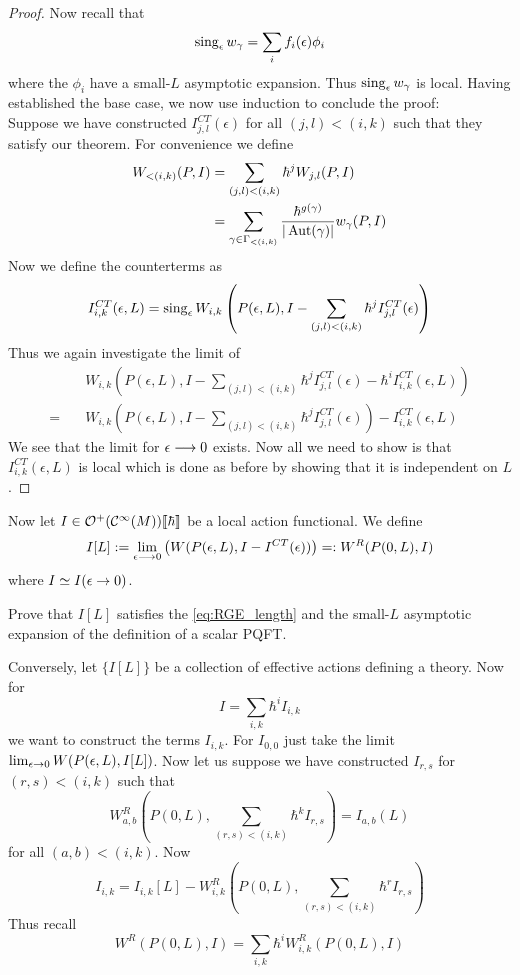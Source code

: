 \begin{theo}
\begin{proof}
  Now recall that
  $$ \sing_\epsilon w_\gamma = \sum_i f_i(\epsilon) \phi_i $$
  where the $\phi_i$ have a small-$L$ asymptotic expansion. Thus $\sing_\epsilon w_\gamma$ is local. Having established the base case, we now use induction to conclude the proof:\\
  Suppose we have constructed $I_{j,l}^{CT}(\epsilon)$ for all $(j,l)<(i,k)$ such that they satisfy our theorem. For convenience we define
  \begin{align}
    W_{<(i,k)} (P,I) &= \sum_{(j,l)<(i,k)} \hbar^j W_{j,l}(P,I)\\
    &= \sum_{\gamma \in \Gamma_{<(i,k)}} \frac{\hbar^{g(\gamma)}}{|\operatorname{Aut}(\gamma)|} w_\gamma (P,I)
  \end{align}
  Now we define the counterterms as
  $$ I_{i,k}^{CT}(\epsilon, L) = \sing_\epsilon W_{i,k}\left(P(\epsilon,L), I - \sum_{(j,l)<(i,k)}\hbar^j I_{j,l}^{CT}(\epsilon)\right) $$
  Thus we again investigate the limit of
  \begin{align}
    &W_{i,k}\left( P(\epsilon,L), I - \sum_{(j,l)<(i,k)}\hbar^j I_{j,l}^{CT}(\epsilon) - \hbar^i I_{i,k}^{CT}(\epsilon, L) \right)\\
    = \quad &W_{i,k}\left( P(\epsilon,L), I - \sum_{(j,l)<(i,k)}\hbar^j I_{j,l}^{CT}(\epsilon) \right) - I_{i,k}^{CT}(\epsilon, L)
  \end{align}
  We see that the limit for $\epsilon \lra 0$ exists. Now all we need to show is that $I_{i,k}^{CT}(\epsilon,L)$ is local which is done as before by showing that it is independent on $L$.
\end{proof}
\end{theo}

Now let $I \in \mathcal{O}^+(\mathcal{C}^{\infty}(M))\llbracket\hbar\rrbracket$ be a local action functional. We define
$$ I[L] := \lim_{\epsilon \lra 0} \left( W(P(\epsilon,L), I - I^{CT}(\epsilon)) \right) =: W^R(P(0,L), I) $$
where $I \simeq I(\epsilon \ra 0) $.

\begin{ex}
  Prove that $I[L]$ satisfies the \eqref{eq:RGE_length} and the small-$L$ asymptotic expansion of the definition of a scalar PQFT.
\end{ex}

Conversely, let $\{I[L]\}$ be a collection of effective actions defining a theory. Now for
$$ I = \sum_{i,k} \hbar^i I_{i,k} $$
we want to construct the terms $I_{i,k}$. For $I_{0,0}$ just take the limit $\lim_{\epsilon \ra 0} W(P(\epsilon,L), I[L])$. Now let us suppose we have constructed $I_{r,s}$ for $(r,s)<(i,k)$ such that
$$ W^R_{a,b}\left(P(0,L), \sum_{(r,s)<(i,k)} \hbar^k I_{r,s}\right) = I_{a,b}(L)$$
for all $(a,b) < (i,k)$. Now
$$I_{i,k} = I_{i,k}[L] - W^R_{i,k}\left(P(0,L), \sum_{(r,s)<(i,k)} \hbar^r I_{r,s} \right)$$
Thus recall
$$ W^R(P(0,L), I) = \sum_{i,k} \hbar^i W_{i,k}^R (P(0,L), I) $$

